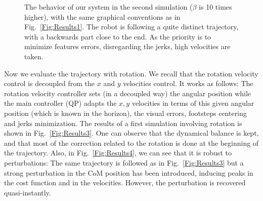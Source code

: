 \begin{figure}[ht]
 \caption[]{\label{Fig:Results2}\small{The behavior of our system in the second simulation ($\beta$ is 10 times higher), with the same graphical conventions as in Fig.~\ref{Fig:Results1}. The robot is following a quite distinct trajectory, with a backwards part close to the end. As the priority is to minimize features errors, disregarding the jerks, high velocities are taken.}}
 \end{figure}

Now we evaluate the trajectory with rotation. We recall that the rotation velocity control is decoupled from the $x$ and $y$ velocities control. It works as follows: The rotation velocity controller sets (in a decoupled way) the angular position while the main controller (QP) adapts the $x,y$ velocities in terms of this given angular position (which is known in the horizon), the visual errors, footsteps centering and jerks minimization. The results of a first simulation involving rotation is shown in Fig.~\ref{Fig:Results3}. One can observe that the dynamical balance is kept, and that most of the correction related to the rotation is done at the beginning of the trajectory. Also, in Fig.~\ref{Fig:Results4}, we can see that it is robust to perturbations: The same trajectory is followed as in Fig.~\ref{Fig:Results3} but a strong perturbation in the CoM position has been introduced, inducing peaks in the cost function and in the velocities. However, the perturbation is recovered quasi-instantly.


